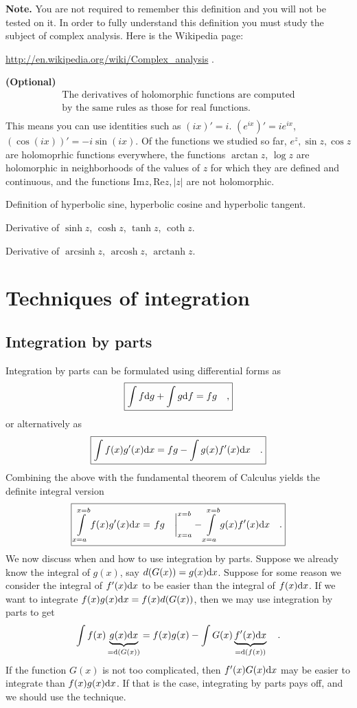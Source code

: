 \documentclass[12pt]{book}
\renewcommand{\Im}{\mathrm{Im}}
\renewcommand{\Re}{\mathrm{Re}}
\DeclareMathOperator{\arcsinh}{arcsinh}
\DeclareMathOperator{\arccosh}{arcosh}
\DeclareMathOperator{\arctanh}{arctanh}
\newcommand{\optionalMaterial}{\textbf{(Optional)}}
\begin{document}
\textbf{Note.} You are not required to remember this definition and you will not be tested on it. In order to fully understand this definition you must study the subject of complex analysis. Here is the Wikipedia page:

\url{http://en.wikipedia.org/wiki/Complex_analysis} \quad .

\optionalMaterial
\[\begin{array}{l}
\text{The derivatives of holomorphic functions are computed} \\
\text{by the same rules as those for real functions.} \\
\end{array}
\]
This means you can use identities such as $(ix)'=i$. $(e^{ix})'=ie^{ix}$, $(\cos (ix))'= -i\sin(ix)$. Of the functions we studied so far, $e^z, \sin z, \cos z$ are holomoprhic functions everywhere, the functions $\arctan z$, $\log z$ are holomorphic in neighborhoods of the values of $z$ for which they are defined and continuous, and the functions $\Im z, \Re z, |z|$ are not holomorphic.




Definition of hyperbolic sine, hyperbolic cosine and hyperbolic tangent.

Derivative of $\sinh z$, $\cosh z$, $\tanh z$, $\coth z$.

Derivative of $ \arcsinh z$, $ \arccosh z$, $ \arctanh z$.
\chapter{Techniques of integration}
\section{Integration by parts}
Integration by parts can be formulated using differential forms as
\begin{equation}\boxed{
\int f {\normalfont \text{d}} g+ \int g {\normalfont \text{d}} f = fg\quad,
}
\end{equation}
or alternatively as
\begin{equation}\boxed{
\int f(x) g'(x){\normalfont \text{d}} x = fg- \int g(x) f'(x){\normalfont \text{d}} x \quad .
}
\end{equation}
Combining the above with the fundamental theorem of Calculus yields the definite integral version
\begin{equation}\boxed{
\int\limits_{x=a}^{x=b} f(x) g'(x)\diff x = \left.fg\phantom\int\right|_{x=a}^{x=b} - \int\limits_{x=a}^{x=b} g(x) f'(x)\diff x \quad.
}
\end{equation}
We now discuss when and how to use integration by parts. Suppose we already know the integral of $g(x)$, say $d(G(x))=g(x){\normalfont \text{d}} x$. Suppose for some reason we consider the integral of $f'(x){\normalfont \text{d}} x$ to be easier than the integral of $f(x){\normalfont \text{d}} x$. If we want to integrate $f(x)g(x){\normalfont \text{d}} x= f(x)d(G(x))$, then we may use integration by parts to get
\[
\int f(x)\underbrace{g(x){\normalfont \text{d}} x}_{={\normalfont \text{d}} (G(x))}= f(x)g(x)- \int G(x) \underbrace{f'(x){\normalfont \text{d}} x}_{={\normalfont \text{d}} (f(x))}\quad .
\]
If the function $G(x)$ is not too complicated, then $f'(x)G(x){\normalfont \text{d}} x$ may be easier to integrate than $f(x)g(x){\normalfont \text{d}} x$. If that is the case, integrating by parts pays off, and we should use the technique.
\end{document}
